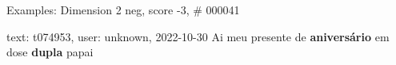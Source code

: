 \begin{frame}{Examples: Dimension 2 neg, score -3, \# 000041}
\footnotesize
\begin{alertblock}{text: t074953, user: unknown, 2022-10-30}
Ai meu presente de \textbf{aniversário} em dose \textbf{dupla} papai 
\end{alertblock}
\end{frame}
